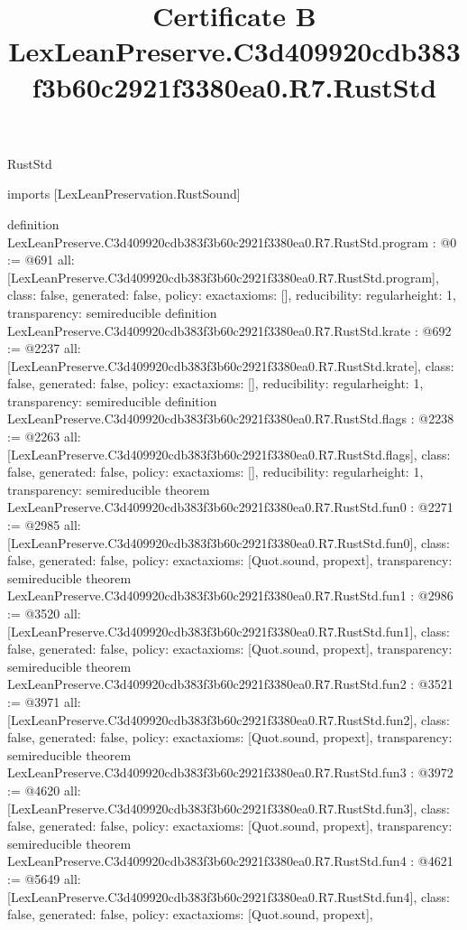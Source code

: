 \begin{lexlean}{RustStd}
\title{Certificate B LexLeanPreserve.C3d409920cdb383f3b60c2921f3380ea0.R7.RustStd}
\begin{coremodule}
imports [LexLeanPreservation.RustSound]

definition LexLeanPreserve.C3d409920cdb383f3b60c2921f3380ea0.R7.RustStd.program : @0 := @691 {
  all: [LexLeanPreserve.C3d409920cdb383f3b60c2921f3380ea0.R7.RustStd.program],
  class: false,
  generated: false,
  policy: exact{axioms: []},
  reducibility: regular{height: 1},
  transparency: semireducible
}
definition LexLeanPreserve.C3d409920cdb383f3b60c2921f3380ea0.R7.RustStd.krate : @692 := @2237 {
  all: [LexLeanPreserve.C3d409920cdb383f3b60c2921f3380ea0.R7.RustStd.krate],
  class: false,
  generated: false,
  policy: exact{axioms: []},
  reducibility: regular{height: 1},
  transparency: semireducible
}
definition LexLeanPreserve.C3d409920cdb383f3b60c2921f3380ea0.R7.RustStd.flags : @2238 := @2263 {
  all: [LexLeanPreserve.C3d409920cdb383f3b60c2921f3380ea0.R7.RustStd.flags],
  class: false,
  generated: false,
  policy: exact{axioms: []},
  reducibility: regular{height: 1},
  transparency: semireducible
}
theorem LexLeanPreserve.C3d409920cdb383f3b60c2921f3380ea0.R7.RustStd.fun0 : @2271 := @2985 {
  all: [LexLeanPreserve.C3d409920cdb383f3b60c2921f3380ea0.R7.RustStd.fun0],
  class: false,
  generated: false,
  policy: exact{axioms: [Quot.sound, propext]},
  transparency: semireducible
}
theorem LexLeanPreserve.C3d409920cdb383f3b60c2921f3380ea0.R7.RustStd.fun1 : @2986 := @3520 {
  all: [LexLeanPreserve.C3d409920cdb383f3b60c2921f3380ea0.R7.RustStd.fun1],
  class: false,
  generated: false,
  policy: exact{axioms: [Quot.sound, propext]},
  transparency: semireducible
}
theorem LexLeanPreserve.C3d409920cdb383f3b60c2921f3380ea0.R7.RustStd.fun2 : @3521 := @3971 {
  all: [LexLeanPreserve.C3d409920cdb383f3b60c2921f3380ea0.R7.RustStd.fun2],
  class: false,
  generated: false,
  policy: exact{axioms: [Quot.sound, propext]},
  transparency: semireducible
}
theorem LexLeanPreserve.C3d409920cdb383f3b60c2921f3380ea0.R7.RustStd.fun3 : @3972 := @4620 {
  all: [LexLeanPreserve.C3d409920cdb383f3b60c2921f3380ea0.R7.RustStd.fun3],
  class: false,
  generated: false,
  policy: exact{axioms: [Quot.sound, propext]},
  transparency: semireducible
}
theorem LexLeanPreserve.C3d409920cdb383f3b60c2921f3380ea0.R7.RustStd.fun4 : @4621 := @5649 {
  all: [LexLeanPreserve.C3d409920cdb383f3b60c2921f3380ea0.R7.RustStd.fun4],
  class: false,
  generated: false,
  policy: exact{axioms: [Quot.sound, propext]},
}
\end{coremodule}
\end{lexlean}
